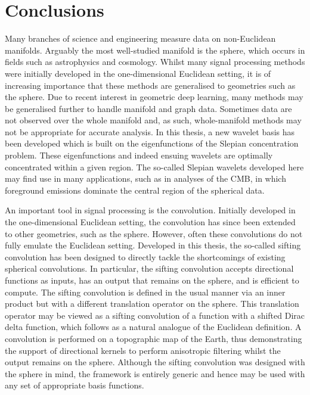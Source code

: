 \chapter{Conclusions}\label{sec:chapter6}

Many branches of science and engineering measure data on non-Euclidean manifolds.
Arguably the most well-studied manifold is the sphere, which occurs in fields such as astrophysics and cosmology.
Whilst many signal processing methods were initially developed in the one-dimensional Euclidean setting, it is of increasing importance that these methods are generalised to geometries such as the sphere.
Due to recent interest in geometric deep learning, many methods may be generalised further to handle manifold and graph data.
Sometimes data are not observed over the whole manifold and, as such, whole-manifold methods may not be appropriate for accurate analysis.
In this thesis, a new wavelet basis has been developed which is built on the eigenfunctions of the Slepian concentration problem.
These eigenfunctions and indeed ensuing wavelets are optimally concentrated within a given region.
The so-called Slepian wavelets developed here may find use in many applications, such as in analyses of the CMB, in which foreground emissions dominate the central region of the spherical data.

An important tool in signal processing is the convolution.
Initially developed in the one-dimensional Euclidean setting, the convolution has since been extended to other geometries, such as the sphere.
However, often these convolutions do not fully emulate the Euclidean setting.
Developed in this thesis, the so-called sifting convolution has been designed to directly tackle the shortcomings of existing spherical convolutions.
In particular, the sifting convolution accepts directional functions as inputs, has an output that remains on the sphere, and is efficient to compute.
The sifting convolution is defined in the usual manner via an inner product but with a different translation operator on the sphere.
This translation operator may be viewed as a sifting convolution of a function with a shifted Dirac delta function, which follows as a natural analogue of the Euclidean definition.
A convolution is performed on a topographic map of the Earth, thus demonstrating the support of directional kernels to perform anisotropic filtering whilst the output remains on the sphere.
Although the sifting convolution was designed with the sphere in mind, the framework is entirely generic and hence may be used with any set of appropriate basis functions.

